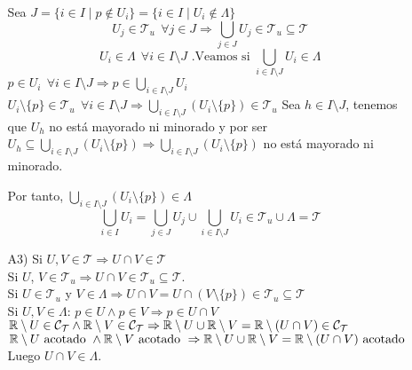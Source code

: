 \documentclass[12pt]{article}
\begin{document}
\begin{ejercicio}[3 puntos]
\begin{enumerate}[label=(\alph*)]
\begin{enumerate}
                        \noindent
                        Sea $J = \{i \in I \mid p \notin U_i\} = \{i \in I \mid U_i \notin \Lambda\}$
                        $$U_j \in \mathcal{T}_u ~~\forall j \in J \Rightarrow \bigcup_{j \in J} U_j \in \mathcal{T}_u \subseteq \mathcal{T}$$
                        $$U_i \in \Lambda~~\forall i \in I \setminus J \mbox{ .Veamos si } \bigcup_{i \in I\setminus J} U_i \in \Lambda$$
                        $p \in U_i~~\forall i \in I \setminus J \Rightarrow p \in \displaystyle \bigcup_{i \in I \setminus J} U_i$\newline
                        $U_i \setminus \{p\} \in \mathcal{T}_u ~~ \forall i \in I \setminus J \Rightarrow \displaystyle \bigcup_{i \in I \setminus J } (U_i \setminus \{p\}) \in \mathcal{T}_u$\newline
                        Sea $h \in I \setminus J$, tenemos que $U_h$ no está mayorado ni minorado y por ser $U_h \subseteq \displaystyle \bigcup_{i \in I \setminus J} (U_i \setminus \{p\}) \Rightarrow \displaystyle \bigcup_{i \in I \setminus J} (U_i \setminus \{p\})$ no está mayorado ni minorado.
                        
                        \noindent
                        Por tanto, $ \displaystyle \bigcup_{i \in I \setminus J} (U_i \setminus \{p\}) \in \Lambda$ 
                        $$\displaystyle \bigcup_{i \in I} U_i = \bigcup_{j \in J}U_j \cup \bigcup_{i \in I \setminus J} U_i \in \mathcal{T}_u \cup \Lambda = \mathcal{T}$$

                    \item[A3)] Si $U, V \in \mathcal{T} \Rightarrow U \cap V \in \mathcal{T}$\\

                        \noindent
                        Si $U$, $V \in \mathcal{T}_u \Rightarrow U \cap V \in \mathcal{T}_u \subseteq \mathcal{T}$.\\

                        \noindent
                        Si $U \in \mathcal{T}_u$ y $V \in \Lambda \Rightarrow U \cap V = U \cap (V \setminus \{p\}) \in \mathcal{T}_u \subseteq \mathcal{T}$\\

                        \noindent
                        Si $U, V \in \Lambda$:\newline
                        $p \in U \land p \in V \Rightarrow p \in U \cap V$\newline
                        $\mathbb{R}\setminus U \in \mathcal{C_T} \land \mathbb{R}\setminus V \in \mathcal{C_T} \Rightarrow \mathbb{R}\setminus U \cup \mathbb{R}\setminus V = \mathbb{R}\setminus (U \cap V)\in \mathcal{C_T}$\newline
                        $\mathbb{R}\setminus U \mbox{ acotado } \land \mathbb{R}\setminus V \mbox{ acotado } \Rightarrow \mathbb{R}\setminus U \cup \mathbb{R}\setminus V = \mathbb{R}\setminus (U \cap V)\mbox{ acotado }$\newline
                        Luego $U \cap V \in \Lambda$.
                \end{enumerate}


\end{enumerate}
\end{ejercicio}
\end{document}
